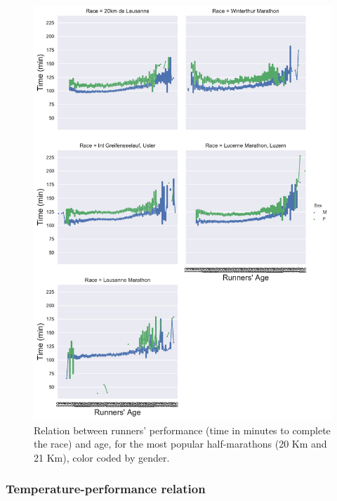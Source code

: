 \documentclass[fleqn,10pt]{wlscirep}
\begin{document}
		
			\begin{figure}[h]	
			
				\centering
				
				\includegraphics[scale=0.6]{../data_analysis/plots_for_paper/performance_VS_age_semi_marathon.pdf}
				
				\caption{Relation between runners' performance (time in minutes to complete the race) and age, for the most popular half-marathons (20 Km and 21 Km), color coded by gender.}
				
				\label{performance_VS_age_semi_marathon}
			
			\end{figure}								
			
		\subsubsection*{Temperature-performance relation}
		
\end{document}
